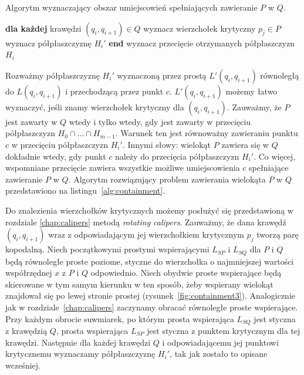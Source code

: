 \begin{algorithm}[b]
  \caption{\label{alg:containment} Algorytm wyznaczający obszar
    umiejscowień spełniających zawieranie $P$ w $Q$.}
\begin{algorithmic}[1]

\State \textbf{dla każdej} krawędzi $(q_i, q_{i+1}) \in Q$
\State \hspace{\algorithmicindent} wyznacz wierzchołek krytyczny $p_j \in P$
\State \hspace{\algorithmicindent} wyznacz półpłaszczyznę $H_i'$
\State \textbf{end}
\State wyznacz przecięcie otrzymanych półpłaszczyzn $H_i$

\EndProcedure
\end{algorithmic}
\end{algorithm}

Rozważmy półpłaszczyznę $H_i'$ wyznaczoną przez prostą
$L'(q_i,q_{i+1})$ równoległą do $L(q_i, q_{i+1})$ i przechodzącą przez
punkt $c$. $L'(q_i,q_{i+1})$ możemy łatwo wyznaczyć, jeśli znamy
wierzchołek krytyczny dla $(q_i, q_{i+1})$. Zauważmy, że $P$ jest
zawarty w $Q$ wtedy i tylko wtedy, gdy jest zawarty w przecięciu
półpłaszczyzn $H_0 \cap \ldots \cap H_{m-1}$. Warunek ten jest
równoważny zawieraniu punktu $c$ w przecięciu półpłaszczyzn
$H_i'$. Innymi słowy: wielokąt $P$ zawiera się w $Q$ dokładnie wtedy,
gdy punkt $c$ należy do przecięcia półpłaszczyzn $H_i'$. Co więcej,
wspomniane przecięcie zawiera wszystkie możliwe umiejscowienia $c$
spełniające zawieranie $P$ w $Q$. Algorytm rozwiązujący problem
zawierania wielokąta $P$ w $Q$ przedstawiono na
listingu~\ref{alg:containment}.

Do znalezienia wierzchołków krytycznych możemy posłużyć się
przedstawioną w rozdziale \ref{chap:calipers} metodą \emph{rotating
  calipers}. Zauważmy, że dana krawędź $(q_i, q_{i+1})$ wraz z
odpowiadającym jej wierzchołkiem krytycznym $p_j$ tworzą parę
kopodalną. Niech początkowymi prostymi wspierającymi $L_{SP}$ i
$L_{SQ}$ dla $P$ i $Q$ będą równoległe proste poziome, styczne do
wierzchołka o najmniejszej wartości współrzędnej $x$ z $P$ i $Q$
odpowiednio. Niech obydwie proste wspierające będą skierowane w tym
samym kierunku w ten sposób, żeby wspierany wielokąt znajdował się po
lewej stronie prostej (rysunek~\ref{fig:containment3}). Analogicznie
jak w rozdziale~\ref{chap:calipers} zaczynamy obracać równoległe
proste wspierające. Przy każdym obrocie suwmiarek, po którym prosta
wspierająca $L_{SQ}$ jest styczna z krawędzią $Q$, prosta wspierająca
$L_{SP}$ jest styczna z punktem krytycznym dla tej krawędzi. Następnie
dla każdej krawędzi $Q$ i odpowiadającemu jej punktowi krytycznemu
wyznaczamy półpłaszczyznę $H_i'$, tak jak zostało to opisane
wcześniej.

